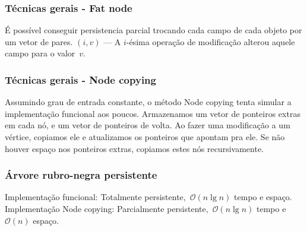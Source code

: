\documentclass[10pt, compress]{beamer}
\newcommand{\Oh}{\mathcal{O}}
\begin{document}
\begin{frame}[fragile]
	\frametitle{Técnicas gerais - Fat node}

	É possível conseguir persistencia parcial trocando cada campo de cada objeto por um vetor de pares.
	\vfill
	$(i, v)$ --- A $i$-ésima operação de modificação alterou aquele campo para o valor~$v$.
	\vfill

\end{frame}

\begin{frame}[fragile]
	\frametitle{Técnicas gerais - Node copying}

	Assumindo grau de entrada constante, o método Node copying tenta simular a implementação funcional aos poucos.
	\vfill
	Armazenamos um vetor de ponteiros extras em cada nó, e um vetor de ponteiros de volta.
	\vfill
	Ao fazer uma modificação a um vértice, copiamos ele e atualizamos os ponteiros que apontam pra ele.
	\vfill
	Se não houver espaço nos ponteiros extras, copiamos estes nós recursivamente.
\end{frame}

\begin{frame}[fragile]
	\frametitle{Árvore rubro-negra persistente}
	Implementação funcional: Totalmente persistente,~$\Oh(n \lg n)$ tempo e espaço.
	\vfill
	Implementação Node copying: Parcialmente persistente,~$\Oh(n \lg n)$ tempo e~$\Oh(n)$ espaço.
	\vfill

\end{frame}
\end{document}
